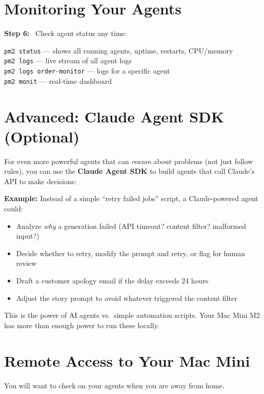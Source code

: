 \documentclass[12pt, letterpaper, oneside]{book}
\newcommand{\step}[1]{\noindent\textbf{\textcolor{primary}{Step #1:}}~}
\begin{document}
\section{Monitoring Your Agents}

\step{6} Check agent status any time:
\begin{actionbox}
\texttt{pm2 status} \quad--- shows all running agents, uptime, restarts, CPU/memory\\
\texttt{pm2 logs} \quad--- live stream of all agent logs\\
\texttt{pm2 logs order-monitor} \quad--- logs for a specific agent\\
\texttt{pm2 monit} \quad--- real-time dashboard
\end{actionbox}

\section{Advanced: Claude Agent SDK (Optional)}

For even more powerful agents that can \textit{reason} about problems (not just follow rules), you can use the \textbf{Claude Agent SDK} to build agents that call Claude's API to make decisions:

\begin{infobox}
\textbf{Example:} Instead of a simple ``retry failed jobs'' script, a Claude-powered agent could:
\begin{itemize}[leftmargin=1.5em, itemsep=2pt]
  \item Analyze \textit{why} a generation failed (API timeout? content filter? malformed input?)
  \item Decide whether to retry, modify the prompt and retry, or flag for human review
  \item Draft a customer apology email if the delay exceeds 24 hours
  \item Adjust the story prompt to avoid whatever triggered the content filter
\end{itemize}
This is the power of AI agents vs.\ simple automation scripts. Your Mac Mini M2 has more than enough power to run these locally.
\end{infobox}

\section{Remote Access to Your Mac Mini}

You will want to check on your agents when you are away from home.
\end{document}
